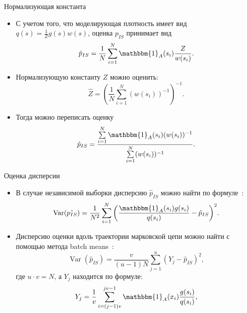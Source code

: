 \documentclass[pdf, 10pt, unicode]{beamer}
\DeclareMathOperator{\Var}{Var}
\begin{document}
\begin{frame}{Нормализующая константа}
\begin{itemize}
    \item С учетом того, что моделирующая плотность имеет вид $q(s) = \frac{1}{Z}g(s)w(s)$, оценка $\hat{p}_{IS}$ принимает вид 
    \begin{equation*}\label{eqn:iswp}
        \hat{p}_{IS} = \frac{1}{N}\sum\limits_{i = 1}^{N}{\mathbbm{1}_{A}(s_i)\frac{Z}{w(s_i)}}.
    \end{equation*}
    
    \item Нормализующую константу $Z$ можно оценить:
    \begin{equation*}\label{eqn:w_est}
       \hat{Z} = \left(\frac{1}{N}\sum\limits_{i = 1}^N{(w(s_i))^{-1}}\right)^{-1}.
    \end{equation*}
    
    \item Тогда можно переписать оценку
    \begin{equation*}\label{eqn:isw}
        \hat{p}_{IS} = \frac{\sum\limits_{i = 1}^{N}\mathbbm{1}_{A}(s_i)(w(s_i))^{-1}}{\sum\limits_{i = 1}^{N}(w(s_i))^{-1}}.
\end{equation*}
\end{itemize}
    
\end{frame}




\begin{frame}{Оценка дисперсии}
\begin{itemize}
\item В случае независимой выборки дисперсию $\hat{p}_{IS}$ можно найти по формуле~\parencite{Owen2020}:
    \begin{equation*}
        \Var(\hat{p_{IS}}) = \frac{1}{N^2}\sum\limits_{i=1}^{N}{\left( \frac{\mathbbm{1}_A(s_i)g(s_i)}{q(s_i)} - \hat{p}_{IS} \right)^2}.
    \end{equation*}

\item Дисперсию оценки вдоль траектории марковской цепи можно найти с помощью метода batch means~\parencite{Jones2006}:
\begin{equation*}
     \Var(\hat{p}_{IS}) = \frac{v}{(u-1)N}\sum\limits_{j = 1}^{u}{(Y_j - \hat{p}_{IS})^2}, 
 \end{equation*}
    где $u\cdot v = N$, а $Y_j$ находится по формуле:
    \begin{equation*}\label{eqn:batch}
    Y_j = \frac{1}{v}\sum\limits_{i = (j - 1)v}^{j v - 1}\mathbbm{1}_{A}(x_i)\frac{g(s_i)}{q(s_i)}, 
\end{equation*}
\end{itemize}    
\end{frame}
\end{document}
